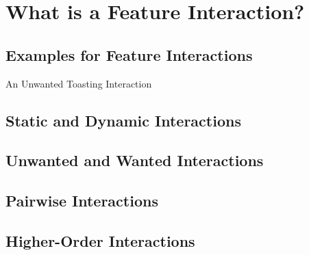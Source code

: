 \documentclass[
	aspectratio=169, %
	8pt, %
	handout, %
]{beamer}
\subtitle{9. Feature Interactions}
\author{Thomas Thüm}
\begin{document}


\section{What is a Feature Interaction?}

\subsection{Examples for Feature Interactions}
\begin{frame}{An Unwanted Toasting Interaction}
\end{frame}

\subsection{Static and Dynamic Interactions}
\subsection{Unwanted and Wanted Interactions} %
\subsection{Pairwise Interactions}
\subsection{Higher-Order Interactions}


%
\end{document}
